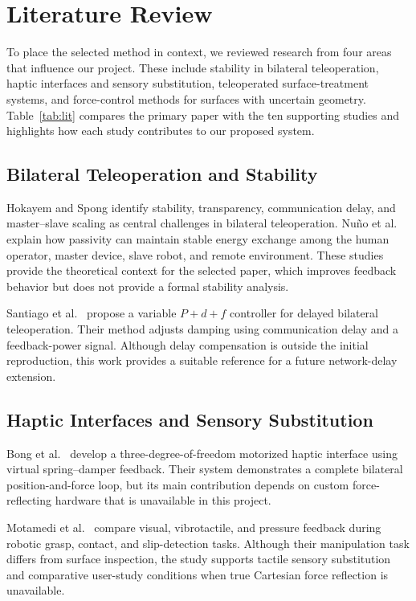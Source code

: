 \documentclass[journal]{IEEEtran}
\begin{document}
\section{Literature Review}
To place the selected method in context, we reviewed research from four areas that influence our project. These include stability in bilateral teleoperation, haptic interfaces and sensory substitution, teleoperated surface-treatment systems, and force-control methods for surfaces with uncertain geometry. Table~\ref{tab:lit} compares the primary paper with the ten supporting studies and highlights how each study contributes to our proposed system.

\subsection{Bilateral Teleoperation and Stability}
Hokayem and Spong \cite{hokayem} identify stability, transparency, communication delay, and master--slave scaling as central challenges in bilateral teleoperation. Nu\~no et al.\ \cite{nuno} explain how passivity can maintain stable energy exchange among the human operator, master device, slave robot, and remote environment. These studies provide the theoretical context for the selected paper, which improves feedback behavior but does not provide a formal stability analysis.

Santiago et al.\ \cite{santiago} propose a variable $P{+}d{+}f$ controller for delayed bilateral teleoperation. Their method adjusts damping using communication delay and a feedback-power signal. Although delay compensation is outside the initial reproduction, this work provides a suitable reference for a future network-delay extension.

\subsection{Haptic Interfaces and Sensory Substitution}
Bong et al.\ \cite{bong} develop a three-degree-of-freedom motorized haptic interface using virtual spring--damper feedback. Their system demonstrates a complete bilateral position-and-force loop, but its main contribution depends on custom force-reflecting hardware that is unavailable in this project.

Motamedi et al.\ \cite{motamedi} compare visual, vibrotactile, and pressure feedback during robotic grasp, contact, and slip-detection tasks. Although their manipulation task differs from surface inspection, the study supports tactile sensory substitution and comparative user-study conditions when true Cartesian force reflection is unavailable.
\end{document}
